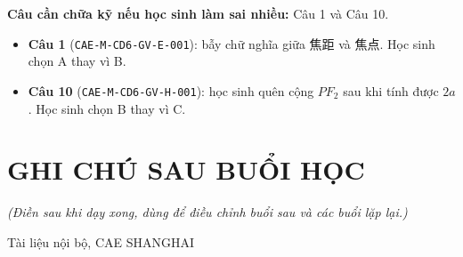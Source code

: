 \documentclass[11pt, a4paper]{article}
\begin{document}

\textbf{Câu cần chữa kỹ nếu học sinh làm sai nhiều:} Câu 1 và Câu 10.

\begin{itemize}[leftmargin=1.4em, itemsep=2pt]
\item \textbf{Câu 1} (\texttt{CAE-M-CD6-GV-E-001}): bẫy chữ nghĩa giữa 焦距 và 焦点. Học sinh chọn A thay vì B.
\item \textbf{Câu 10} (\texttt{CAE-M-CD6-GV-H-001}): học sinh quên cộng $PF_2$ sau khi tính được $2a$. Học sinh chọn B thay vì C.
\end{itemize}

\section{GHI CHÚ SAU BUỔI HỌC}

\emph{(Điền sau khi dạy xong, dùng để điều chỉnh buổi sau và các buổi lặp lại.)}

\vspace{0.8cm}
\begin{center}
{\footnotesize\color{cae_blue} Tài liệu nội bộ, CAE SHANGHAI}
\end{center}
\end{document}
